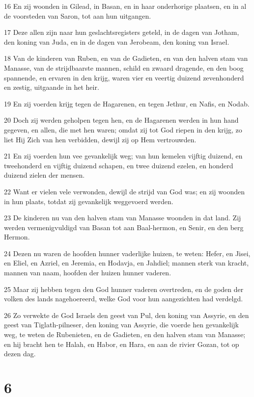 \par 16 En zij woonden in Gilead, in Basan, en in haar onderhorige plaatsen, en in al de voorsteden van Saron, tot aan hun uitgangen.
\par 17 Deze allen zijn naar hun geslachtsregisters geteld, in de dagen van Jotham, den koning van Juda, en in de dagen van Jerobeam, den koning van Israel.
\par 18 Van de kinderen van Ruben, en van de Gadieten, en van den halven stam van Manasse, van de strijdbaarste mannen, schild en zwaard dragende, en den boog spannende, en ervaren in den krijg, waren vier en veertig duizend zevenhonderd en zestig, uitgaande in het heir.
\par 19 En zij voerden krijg tegen de Hagarenen, en tegen Jethur, en Nafis, en Nodab.
\par 20 Doch zij werden geholpen tegen hen, en de Hagarenen werden in hun hand gegeven, en allen, die met hen waren; omdat zij tot God riepen in den krijg, zo liet Hij Zich van hen verbidden, dewijl zij op Hem vertrouwden.
\par 21 En zij voerden hun vee gevankelijk weg; van hun kemelen vijftig duizend, en tweehonderd en vijftig duizend schapen, en twee duizend ezelen, en honderd duizend zielen der mensen.
\par 22 Want er vielen vele verwonden, dewijl de strijd van God was; en zij woonden in hun plaats, totdat zij gevankelijk weggevoerd werden.
\par 23 De kinderen nu van den halven stam van Manasse woonden in dat land. Zij werden vermenigvuldigd van Basan tot aan Baal-hermon, en Senir, en den berg Hermon.
\par 24 Dezen nu waren de hoofden hunner vaderlijke huizen, te weten: Hefer, en Jisei, en Eliel, en Azriel, en Jeremia, en Hodavja, en Jahdiel; mannen sterk van kracht, mannen van naam, hoofden der huizen hunner vaderen.
\par 25 Maar zij hebben tegen den God hunner vaderen overtreden, en de goden der volken des lands nagehoereerd, welke God voor hun aangezichten had verdelgd.
\par 26 Zo verwekte de God Israels den geest van Pul, den koning van Assyrie, en den geest van Tiglath-pilneser, den koning van Assyrie, die voerde hen gevankelijk weg, te weten de Rubenieten, en de Gadieten, en den halven stam van Manasse; en hij bracht hen te Halah, en Habor, en Hara, en aan de rivier Gozan, tot op dezen dag.

\chapter{6}

